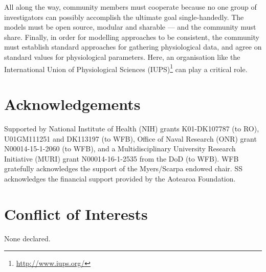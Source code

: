 \documentclass[fleqn,10pt]{physiome}
\begin{document}
All along the way, community members must cooperate because no one group of investigators can possibly accomplish the ultimate goal single-handedly. The models must be open source, modular and sharable --- and the community must share. Finally, in order for modelling approaches to be consistent, the community must establish standard approaches for gathering physiological data, and agree on standard values for physiological parameters. Here, an organisation like the International Union of Physiological Sciences (IUPS)\footnote{\url{http://www.iups.org/}} can play a critical role.

\section{Acknowledgements}

Supported by National Institute of Health (NIH) grants K01-DK107787 (to RO), U01GM111251 and DK113197 (to WFB), Office of Naval Research (ONR) grant N00014-15-1-2060 (to WFB), and a Multidisciplinary University Research Initiative (MURI) grant N00014-16-1-2535 from the DoD (to WFB). WFB gratefully acknowledges the support of the Myers/Scarpa endowed chair. SS acknowledges the financial support provided by the Aotearoa Foundation.

\section{Conflict of Interests}

None declared.


\end{document}
